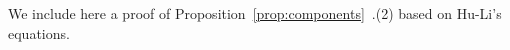 \documentclass[11pt]{amsart}
\newcommand{\PP}{\mathbb P}
\renewcommand{\to}{\rightarrow}
\theoremstyle{plain}
\newtheorem{prop}[thm]{Proposition}
\theoremstyle{definition}
\begin{document}
 We include here a proof of Proposition~\ref{prop:components}~.(2) based on Hu-Li's equations.


\end{document}
